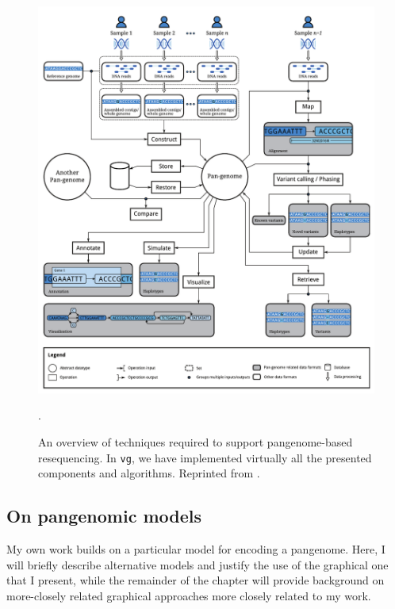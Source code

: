 \documentclass[a4paper,12pt,numbered,oneside]{Classes/PhDThesisPSnPDF}
\begin{document}
\begin{figure}[htbp!]
  \centering
  \includegraphics[width=1.0\textwidth]{Chapter1/Figs/cpang_fig2.pdf}
  \caption[Computational pangenomics]{
    An overview of techniques required to support pangenome-based resequencing.
    In {\tt vg}, we have implemented virtually all the presented components and algorithms.
    Reprinted from \cite{computational2016computational}.
    } 
\label{fig:pangenomic_processes}.
\end{figure}



\subsection{On pangenomic models}

\label{sec:on_pangenomic_models}

My own work builds on a particular model for encoding a pangenome.
Here, I will briefly describe alternative models and justify the use of the graphical one that I present, while the remainder of the chapter will provide background on more-closely related graphical approaches more closely related to my work.
\end{document}
